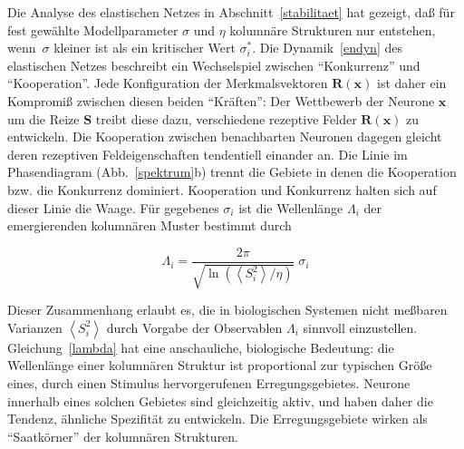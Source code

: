 Die Analyse des elastischen Netzes in Abschnitt~\ref{stabilitaet} hat
gezeigt, daß für fest gewählte Modellparameter $\sigma$ und $\eta$
kolumnäre Strukturen nur entstehen, wenn~$\sigma$ kleiner ist als ein
kritischer Wert $\sigma_i^\ast$.  Die Dynamik~\eqref{endyn} des elastischen
Netzes beschreibt ein Wechselspiel zwischen ``Konkurrenz'' und
``Kooperation''.  Jede Konfiguration der Merkmalsvektoren $\mathbf{R(x)}$
ist daher ein Kompromiß zwischen diesen beiden ``Kräften'': Der
Wettbewerb der Neurone $\mathbf{x}$ um die Reize $\mathbf{S}$ treibt diese
dazu, verschiedene rezeptive Felder $\mathbf{R(x)}$ zu entwickeln. Die
Kooperation zwischen benachbarten Neuronen dagegen gleicht deren rezeptiven
Feldeigenschaften tendentiell einander an.  Die Linie im Phasendiagram
(Abb.~\ref{spektrum}b) trennt die Gebiete in denen die Kooperation
bzw. die Konkurrenz dominiert. Kooperation und Konkurrenz halten sich auf
dieser Linie die Waage. Für gegebenes $\sigma_i$ ist die Wellenlänge
$\Lambda_i$ der emergierenden kolumnären Muster bestimmt durch

\begin{equation}
\Lambda_i = \frac{2 \pi}{\sqrt{\ln\left(\left<S_i^2\right>/\eta\right)}}\;\sigma_i
\label{lambda}
\end{equation}

Dieser Zusammenhang erlaubt es, die in biologischen Systemen nicht
meßbaren Varianzen $\left<S_i^2\right>$ durch Vorgabe der Observablen
$\Lambda_i$ sinnvoll einzustellen.  Gleichung~\eqref{lambda} hat eine
anschauliche, biologische Bedeutung: die Wellenlänge einer kolumnären
Struktur ist proportional zur typischen Größe eines, durch einen Stimulus
hervorgerufenen Erregungsgebietes. Neurone innerhalb eines solchen Gebietes
sind gleichzeitig aktiv, und haben daher die Tendenz, ähnliche Spezifität
zu entwickeln. Die Erregungsgebiete wirken als ``Saatkörner'' der
kolumnären Strukturen.
